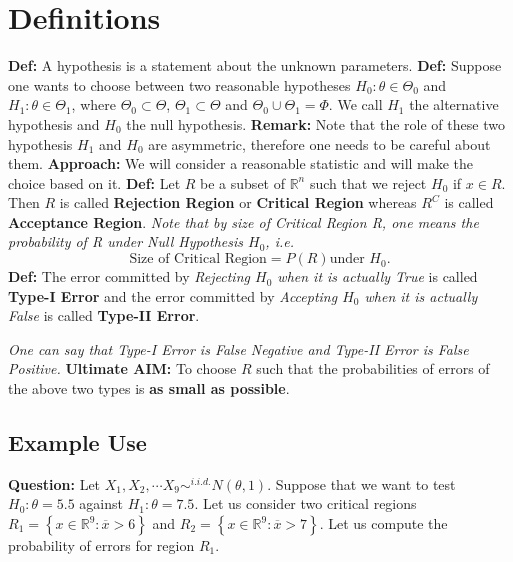 \documentclass[a4paper]{article}
\begin{document}
\section{Definitions}
\textbf{Def:} A hypothesis is a statement about the unknown parameters.
\newline\newline
\textbf{Def:} Suppose one wants to choose between two reasonable hypotheses $H_0 : \theta \in \Theta_0$ and $H_1 : \theta \in \Theta_1$, where $\Theta_0 \subset \Theta$, $\Theta_1 \subset \Theta$ and $\Theta_0\cup \Theta_1 = \Phi$. We call $H_1$ the alternative hypothesis and $H_0$ the null hypothesis.
\newline\newline
\textbf{Remark:} Note that the role of these two hypothesis $H_1$ and $H_0$ are asymmetric, therefore one needs to be careful about them.
\newline\newline
\textbf{Approach:} We will consider a reasonable statistic and will make the choice based on it.
\newline\newline
\textbf{Def:} Let $R$ be a subset of  $\mathbb{R}^{n}$ such that we reject  $ H_0$ if $x \in R$. Then $R$ is called \textbf{Rejection Region } or \textbf{Critical Region} whereas $R^{C}$ is called \textbf{Acceptance Region}.
\newline
\textit{Note that by size of Critical Region R, one means the probability of R under Null Hypothesis $H_0$, i.e. \[
		\text{Size of Critical Region} = P\left( R \right) \text{under $H_0$}
.\] }
\newline
\textbf{Def:} The error committed by \textit{Rejecting $H_0$ when it is actually True}	is called \textbf{Type-I Error} and the error  committed by \textit{Accepting $H_0$ when it is actually False} is called \textbf{Type-II Error}.
 
\textit{One can say that Type-I Error is False Negative and Type-II Error is False Positive.}
\newline\newline
\textbf{Ultimate AIM:} To choose $R$ such that the probabilities of errors of the above two types is \textbf{as small as possible}.
\newline
\subsection{Example Use}
\textbf{Question:} Let $X_1,X_2, \cdots X_9 \sim^{i.i.d.} N(\theta,1).$ Suppose that we want to test $H_0: \theta = 5.5$ against $H_1: \theta = 7.5$. Let us consider two critical regions $R_1 = \left\{ x \in \mathbb{R}^{9}:\overline{x}>6 \right\} $ and $R_2 = \left\{ x \in \mathbb{R}^{9}: \overline{x} > 7 \right\} $. 
\newline\newline
Let us compute the probability of errors  for region $R_1$.
\end{document}
